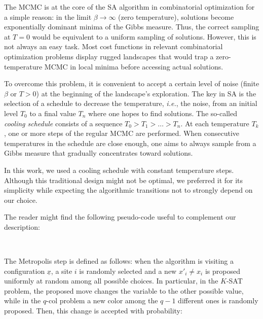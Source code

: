 \documentclass{article}
\begin{document}
The MCMC is at the core of the SA algorithm in combinatorial optimization for a simple reason: in the limit $\beta \to \infty$ (zero temperature), solutions become exponentially dominant minima of the Gibbs measure. Thus, the correct sampling at $T=0$ would be equivalent to a uniform sampling of solutions. However, this is not always an easy task. Most cost functions in relevant combinatorial optimization problems display rugged landscapes that would trap a zero-temperature MCMC in local minima before accessing actual solutions.

To overcome this problem, it is convenient to accept a certain level of noise (finite $\beta$ or $T>0$) at the beginning of the landscape's exploration. The key in SA is the selection of a schedule to decrease the temperature, \textit{i.e.}, the noise, from an initial level $T_0$ to a final value $T_n$ where one hopes to find solutions. The so-called \emph{cooling schedule} consists of a sequence $T_0 > T_1 > \ldots > T_n$. At each temperature $T_k$, one or more steps of the regular MCMC are performed. When consecutive temperatures in the schedule are close enough, one aims to always sample from a Gibbs measure that gradually concentrates toward solutions. 

In this work, we used a cooling schedule with constant temperature steps. Although this traditional design \cite{KirkpatrickSA1983} might not be optimal, we preferred it for its simplicity while expecting the algorithmic transitions not to strongly depend on our choice.

The reader might find the following pseudo-code useful to complement our description:
 \begin{algorithm}[H]
\begin{algorithmic}[1]
    \EndFor \\
  \end{algorithmic}
  \caption{Simulated Annealing}
 \label{alg:SA}
\end{algorithm}

The Metropolis step \cite{Metropolis1953} is defined as follows: when the algorithm is visiting a configuration $\underline{x}$, a site $i$ is randomly selected and a new $x'_i \neq x_i$ is proposed uniformly at random among all possible choices. In particular, in the $K$-SAT problem, the proposed move changes the variable to the other possible value, while in the $q$-col problem a new color among the $q-1$ different ones is randomly proposed. Then, this change is accepted with probability:
\end{document}
